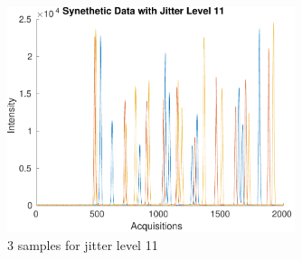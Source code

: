\documentclass[preprint,12pt]{elsarticle}
\begin{document}
\begin{figure}[h]
    \centering
    \includegraphics[width=0.75\textwidth]{figures/jitter_illustration11.pdf}
    \caption{3 samples for jitter level 11}
    \label{fig:afigure11}
\end{figure}






\end{document}
